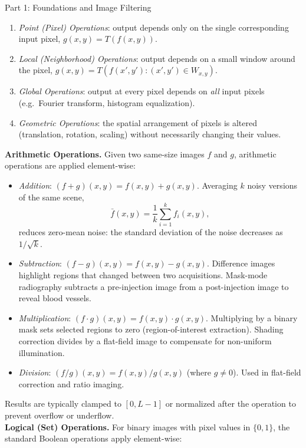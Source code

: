 \documentclass[letterpaper]{article}
\begin{document}
\begin{notes}{Part 1: Foundations and Image Filtering}
\begin{enumerate}
    \item \textit{Point (Pixel) Operations}: output depends only on the single corresponding input pixel, $g(x,y) = T(f(x,y))$.
    \item \textit{Local (Neighborhood) Operations}: output depends on a small window around the pixel, $g(x,y) = T(f(x',y') : (x',y')\in W_{x,y})$.
    \item \textit{Global Operations}: output at every pixel depends on \emph{all} input pixels (e.g.\ Fourier transform, histogram equalization).
    \item \textit{Geometric Operations}: the spatial arrangement of pixels is altered (translation, rotation, scaling) without necessarily changing their values.
\end{enumerate}

\textbf{Arithmetic Operations.} Given two same-size images $f$ and $g$, arithmetic operations are applied element-wise:

\begin{itemize}
    \item \textit{Addition}: $(f+g)(x,y)=f(x,y)+g(x,y)$. Averaging $k$ noisy versions of the same scene,
    $$\bar{f}(x,y) = \frac{1}{k}\sum_{i=1}^k f_i(x,y),$$
    reduces zero-mean noise: the standard deviation of the noise decreases as $1/\sqrt{k}$.

    \item \textit{Subtraction}: $(f-g)(x,y)=f(x,y)-g(x,y)$. Difference images highlight regions that changed between two acquisitions. Mask-mode radiography subtracts a pre-injection image from a post-injection image to reveal blood vessels.

    \item \textit{Multiplication}: $(f\cdot g)(x,y)=f(x,y)\cdot g(x,y)$. Multiplying by a binary mask sets selected regions to zero (region-of-interest extraction). Shading correction divides by a flat-field image to compensate for non-uniform illumination.

    \item \textit{Division}: $(f/g)(x,y)=f(x,y)/g(x,y)$ (where $g\neq 0$). Used in flat-field correction and ratio imaging.
\end{itemize}

Results are typically clamped to $[0, L-1]$ or normalized after the operation to prevent overflow or underflow.\\

\textbf{Logical (Set) Operations.} For binary images with pixel values in $\{0,1\}$, the standard Boolean operations apply element-wise:


\end{notes}
\end{document}
